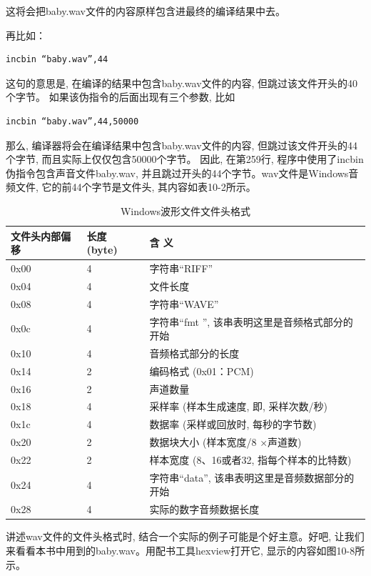 \documentclass[12pt]{article}
\begin{document}
\begin{CJK}{UTF8}{gbsn}
这将会把baby.wav文件的内容原样包含进最终的编译结果中去。

再比如：

\begin{verbatim}
incbin “baby.wav”,44
\end{verbatim}

这句的意思是, 在编译的结果中包含baby.wav文件的内容, 但跳过该文件开头的40个字节。
如果该伪指令的后面出现有三个参数, 比如

\begin{verbatim}
incbin “baby.wav”,44,50000
\end{verbatim}

那么, 编译器将会在编译结果中包含baby.wav文件的内容, 但跳过该文件开头的44个字节, 而且实际上仅仅包含50000个字节。
因此, 在第259行, 程序中使用了incbin伪指令包含声音文件baby.wav, 并且跳过开头的44个字节。wav文件是Windows音频文件, 它的前44个字节是文件头, 其内容如表10-2所示。

\begin{longtable}{p{1.7cm}p{1.1cm}p{4.8cm}}
\caption{Windows波形文件文件头格式}\label{win_wave} \\
\hline
文件头内部偏移	& 长度 (byte) 	& 含    义\\
\hline
0x00 & 4 & 字符串“RIFF”\\
\hline
0x04 & 4 & 文件长度\\
\hline
0x08 & 4 & 字符串“WAVE”\\
\hline
0x0c & 4 & 字符串“fmt ”, 该串表明这里是音频格式部分的开始\\
\hline
0x10 & 4 & 音频格式部分的长度\\
\hline
0x14 & 2 & 编码格式 (0x01：PCM) \\
\hline
0x16 & 2 & 声道数量\\
\hline
0x18 & 4 & 采样率 (样本生成速度, 即, 采样次数/秒) \\
\hline
0x1c & 4 & 数据率 (采样或回放时, 每秒的字节数) \\
\hline
0x20 & 2 & 数据块大小 (样本宽度/8 ×声道数) \\
\hline
0x22 & 2 & 样本宽度 (8、16或者32, 指每个样本的比特数) \\
\hline
0x24 & 4 & 字符串“data”, 该串表明这里是音频数据部分的开始\\
\hline
0x28 & 4 & 实际的数字音频数据长度 \\
\hline
\end{longtable}

讲述wav文件的文件头格式时, 结合一个实际的例子可能是个好主意。好吧, 让我们来看看本书中用到的baby.wav。用配书工具hexview打开它, 显示的内容如图10-8所示。
 

\end{CJK}
\end{document}

